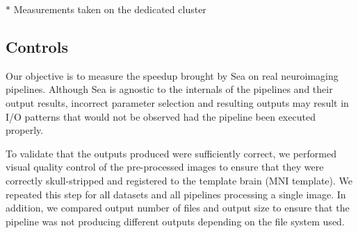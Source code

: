     \begin{table}[t]
      \small\centering
    \footnotesize{$*$ Measurements taken on the dedicated cluster}
    \caption{Pipeline execution characteristics}\label{table:seaneuro:pipelines}
    \end{table}

    \subsection{Controls}
    Our objective is to measure the speedup brought by Sea on real neuroimaging
    pipelines. Although Sea is agnostic to the internals of the pipelines and
    their output results, incorrect parameter selection and resulting outputs
    may result in I/O patterns that would not be observed had the pipeline been
    executed properly.
   
    To validate that the outputs produced were sufficiently correct, we
    performed visual quality control of the pre-processed images to ensure that
    they were correctly skull-stripped and registered to the template brain (MNI
    template). We repeated this step for all datasets and all pipelines
    processing a single image. In addition, we compared output number of files
    and output size to ensure that the pipeline was not producing different
    outputs depending on the file system used.
    
